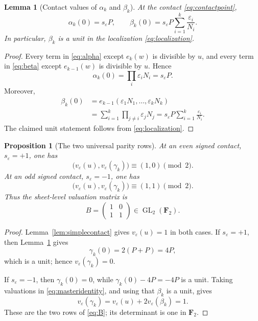 \documentclass[11pt,a4paper]{article}
\newtheorem{proposition}[theorem]{Proposition}
\newtheorem{lemma}[theorem]{Lemma}
\theoremstyle{definition}
\theoremstyle{remark}
\newcommand{\Ftwo}{\mathbf F_2}
\newcommand{\eps}{\varepsilon}
\begin{document}
\begin{lemma}[Contact values of $\alpha_k$ and $\beta_k$]
\label{lem:contactvalues}
At the contact \eqref{eq:contactpoint},
\begin{equation}
 \alpha_k(0)=s_\eps P,\qquad
 \beta_k(0)=s_\eps P\sum_{i=1}^k\frac{\eps_i}{N_i}.
 \label{eq:contactvalues}
\end{equation}
In particular, $\beta_k$ is a unit in the localization
\eqref{eq:localization}.
\end{lemma}

\begin{proof}
Every term in \eqref{eq:alpha} except $e_k(w)$ is divisible by $u$, and every
term in \eqref{eq:beta} except $e_{k-1}(w)$ is divisible by $u$.  Hence
\[
 \alpha_k(0)=\prod_i\eps_iN_i=s_\eps P.
\]
Moreover,
\begin{align*}
 \beta_k(0)
 &=e_{k-1}(\eps_1N_1,\ldots,\eps_kN_k)\\
 &=\sum_{i=1}^k\prod_{j\neq i}\eps_jN_j
 =s_\eps P\sum_{i=1}^k\frac{\eps_i}{N_i}.
\end{align*}
The claimed unit statement follows from \eqref{eq:localization}.
\end{proof}

\begin{proposition}[The two universal parity rows]
\label{prop:rows}
At an even signed contact, $s_\eps=+1$, one has
\[
 \bigl(v_\eps(u),v_\eps(\gamma_k)\bigr)\equiv(1,0)\pmod2.
\]
At an odd signed contact, $s_\eps=-1$, one has
\[
 \bigl(v_\eps(u),v_\eps(\gamma_k)\bigr)\equiv(1,1)\pmod2.
\]
Thus the sheet-level valuation matrix is
\begin{equation}
 B=
 \begin{pmatrix}
 1&0\\
 1&1
 \end{pmatrix}\in\operatorname{GL}_2(\Ftwo).
 \label{eq:B}
\end{equation}
\end{proposition}

\begin{proof}
Lemma~\ref{lem:simplecontact} gives $v_\eps(u)=1$ in both cases.  If
$s_\eps=+1$, then Lemma~\ref{lem:contactvalues} gives
\[
 \gamma_k(0)=2(P+P)=4P,
\]
which is a unit; hence $v_\eps(\gamma_k)=0$.

If $s_\eps=-1$, then $\gamma_k(0)=0$, while
$\gamma_k(0)-4P=-4P$ is a unit.  Taking valuations in
\eqref{eq:masteridentity}, and using that $\beta_k$ is a unit, gives
\[
 v_\eps(\gamma_k)
 =v_\eps(u)+2v_\eps(\beta_k)=1.
\]
These are the two rows of \eqref{eq:B}; its determinant is one in $\Ftwo$.
\end{proof}
\end{document}
